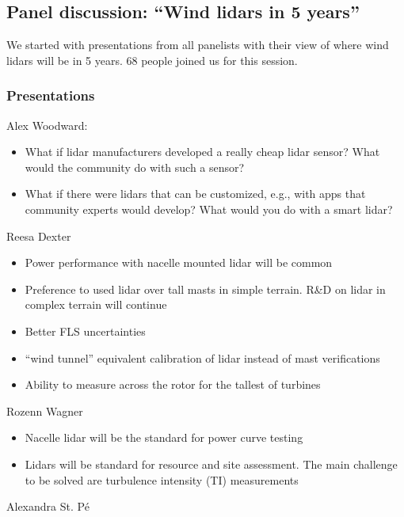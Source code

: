 \subsection{Panel discussion: “Wind lidars in 5 years”}

We started with presentations from all panelists with their view of where wind lidars will be in 5 years. 68 people joined us for this session.

\subsubsection{Presentations}
Alex Woodward:
\begin{itemize}
    \item What if lidar manufacturers developed a really cheap lidar sensor? What would the community do with such a sensor? 
    \item What if there were lidars that can be customized, e.g., with apps that community experts would develop? What would you do with a smart lidar?
\end{itemize}
Reesa Dexter
\begin{itemize}
    \item Power performance with nacelle mounted lidar will be common
    \item Preference to used lidar over tall masts in simple terrain. R\&D on lidar in complex terrain will continue
    \item Better FLS uncertainties
    \item “wind tunnel” equivalent calibration of lidar instead of mast verifications
    \item Ability to measure across the rotor for the tallest of turbines    
\end{itemize}
Rozenn Wagner
\begin{itemize}
    \item Nacelle lidar will be the standard for power curve testing
    \item Lidars will be standard for resource and site assessment. The main challenge to be solved are turbulence intensity (TI) measurements
\end{itemize}
Alexandra St. Pé
